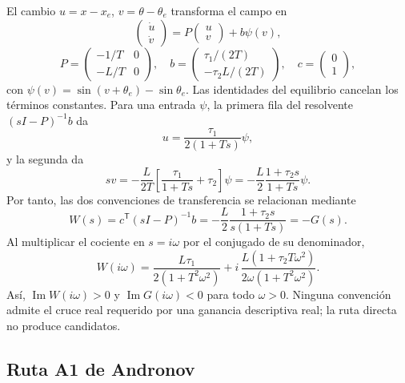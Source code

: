 El cambio \(u=x-x_e\), \(v=\theta-\theta_e\) transforma el campo en
\[
 \begin{pmatrix}\dot u\\\dot v\end{pmatrix}
 =P\begin{pmatrix}u\\v\end{pmatrix}+b\psi(v),
\]
\[
 P=\begin{pmatrix}-1/T&0\\-L/T&0\end{pmatrix},\quad
 b=\begin{pmatrix}\tau_1/(2T)\\-\tau_2L/(2T)\end{pmatrix},
 \quad c=\begin{pmatrix}0\\1\end{pmatrix},
\]
con \(\psi(v)=\sin(v+\theta_e)-\sin\theta_e\). Las identidades del
equilibrio cancelan los términos constantes. Para una entrada \(\psi\),
la primera fila del resolvente \((sI-P)^{-1}b\) da
\[
 u=\frac{\tau_1}{2(1+Ts)}\psi,
\]
y la segunda da
\[
 sv=-\frac L{2T}\left[\frac{\tau_1}{1+Ts}+\tau_2\right]\psi
    =-\frac L2\frac{1+\tau_2s}{1+Ts}\psi.
\]
Por tanto, las dos convenciones de transferencia se relacionan mediante
\begin{equation}
 W(s)=c^{\mathsf T}(sI-P)^{-1}b
     =-\frac L2\frac{1+\tau_2s}{s(1+Ts)}=-G(s).
 \label{int:eq:pll-transfer}
\end{equation}
Al multiplicar el cociente en \(s=i\omega\) por el conjugado de su
denominador,
\[
 W(i\omega)=\frac{L\tau_1}{2(1+T^2\omega^2)}
 +i\,\frac{L(1+\tau_2T\omega^2)}{2\omega(1+T^2\omega^2)}.
\]
Así, \(\operatorname{Im}W(i\omega)>0\) y
\(\operatorname{Im}G(i\omega)<0\) para todo \(\omega>0\). Ninguna
convención admite el cruce real requerido por una ganancia descriptiva real;
la ruta directa no produce candidatos.

\subsection{Ruta A1 de Andronov}

